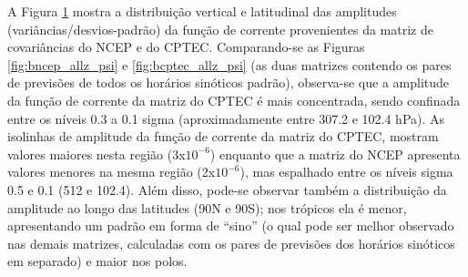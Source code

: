 \begin{figure}[H]
\begin{center}
    \end{center}
    \vspace{2mm}
    \label{fig:B_mcgav4_psi}
\end{figure}

A Figura \ref{fig:B_mcgav4_psi} mostra a distribuição vertical e latitudinal das amplitudes (variâncias/desvios-padrão) da função de corrente provenientes da matriz de covariâncias do NCEP e do CPTEC. Comparando-se as Figuras \ref{fig:bncep_allz_psi} e \ref{fig:bcptec_allz_psi} (as duas matrizes contendo os pares de previsões de todos os horários sinóticos padrão), observa-se que a amplitude da função de corrente da matriz do CPTEC é mais concentrada, sendo confinada entre os níveis 0.3 a 0.1 sigma (aproximadamente entre 307.2 e 102.4 hPa). As isolinhas de amplitude da função de corrente da matriz do CPTEC, mostram valores maiores nesta região (3x$10^{-6}$) enquanto que a matriz do NCEP apresenta valores menores na mesma região (2x$10^{-6}$), mas espalhado entre os níveis sigma 0.5 e 0.1 (512 e 102.4). Além disso, pode-se observar também a distribuição da amplitude ao longo das latitudes (90N e 90S); nos trópicos ela é menor, apresentando um padrão em forma de ``sino'' (o qual pode ser melhor observado nas demais matrizes, calculadas com os pares de previsões dos horários sinóticos em separado) e maior nos polos.

